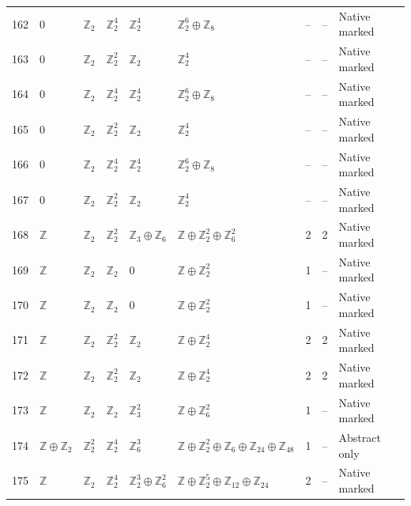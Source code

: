 \documentclass[10pt]{article}
\begin{document}
\begin{longtable}{r|lllll|rrl}
162 & $0$ & $\mathbb{Z}_{2}$ & $\mathbb{Z}_{2}^{4}$ & $\mathbb{Z}_{2}^{4}$ & $\mathbb{Z}_{2}^{6}\oplus \mathbb{Z}_{8}$ & -- & -- & Native marked\\
163 & $0$ & $\mathbb{Z}_{2}$ & $\mathbb{Z}_{2}^{2}$ & $\mathbb{Z}_{2}$ & $\mathbb{Z}_{2}^{4}$ & -- & -- & Native marked\\
164 & $0$ & $\mathbb{Z}_{2}$ & $\mathbb{Z}_{2}^{4}$ & $\mathbb{Z}_{2}^{4}$ & $\mathbb{Z}_{2}^{6}\oplus \mathbb{Z}_{8}$ & -- & -- & Native marked\\
165 & $0$ & $\mathbb{Z}_{2}$ & $\mathbb{Z}_{2}^{2}$ & $\mathbb{Z}_{2}$ & $\mathbb{Z}_{2}^{4}$ & -- & -- & Native marked\\
166 & $0$ & $\mathbb{Z}_{2}$ & $\mathbb{Z}_{2}^{4}$ & $\mathbb{Z}_{2}^{4}$ & $\mathbb{Z}_{2}^{6}\oplus \mathbb{Z}_{8}$ & -- & -- & Native marked\\
167 & $0$ & $\mathbb{Z}_{2}$ & $\mathbb{Z}_{2}^{2}$ & $\mathbb{Z}_{2}$ & $\mathbb{Z}_{2}^{4}$ & -- & -- & Native marked\\
168 & $\mathbb{Z}$ & $\mathbb{Z}_{2}$ & $\mathbb{Z}_{2}^{2}$ & $\mathbb{Z}_{3}\oplus \mathbb{Z}_{6}$ & $\mathbb{Z}\oplus \mathbb{Z}_{2}^{2}\oplus \mathbb{Z}_{6}^{2}$ & 2 & 2 & Native marked\\
169 & $\mathbb{Z}$ & $\mathbb{Z}_{2}$ & $\mathbb{Z}_{2}$ & $0$ & $\mathbb{Z}\oplus \mathbb{Z}_{2}^{2}$ & 1 & -- & Native marked\\
170 & $\mathbb{Z}$ & $\mathbb{Z}_{2}$ & $\mathbb{Z}_{2}$ & $0$ & $\mathbb{Z}\oplus \mathbb{Z}_{2}^{2}$ & 1 & -- & Native marked\\
171 & $\mathbb{Z}$ & $\mathbb{Z}_{2}$ & $\mathbb{Z}_{2}^{2}$ & $\mathbb{Z}_{2}$ & $\mathbb{Z}\oplus \mathbb{Z}_{2}^{4}$ & 2 & 2 & Native marked\\
172 & $\mathbb{Z}$ & $\mathbb{Z}_{2}$ & $\mathbb{Z}_{2}^{2}$ & $\mathbb{Z}_{2}$ & $\mathbb{Z}\oplus \mathbb{Z}_{2}^{4}$ & 2 & 2 & Native marked\\
173 & $\mathbb{Z}$ & $\mathbb{Z}_{2}$ & $\mathbb{Z}_{2}$ & $\mathbb{Z}_{3}^{2}$ & $\mathbb{Z}\oplus \mathbb{Z}_{6}^{2}$ & 1 & -- & Native marked\\
174 & $\mathbb{Z}\oplus \mathbb{Z}_{2}$ & $\mathbb{Z}_{2}^{2}$ & $\mathbb{Z}_{2}^{4}$ & $\mathbb{Z}_{6}^{3}$ & $\mathbb{Z}\oplus \mathbb{Z}_{2}^{2}\oplus \mathbb{Z}_{6}\oplus \mathbb{Z}_{24}\oplus \mathbb{Z}_{48}$ & 1 & -- & Abstract only\\
175 & $\mathbb{Z}$ & $\mathbb{Z}_{2}$ & $\mathbb{Z}_{2}^{4}$ & $\mathbb{Z}_{2}^{3}\oplus \mathbb{Z}_{6}^{2}$ & $\mathbb{Z}\oplus \mathbb{Z}_{2}^{5}\oplus \mathbb{Z}_{12}\oplus \mathbb{Z}_{24}$ & 2 & -- & Native marked\\

\end{longtable}
\end{document}
